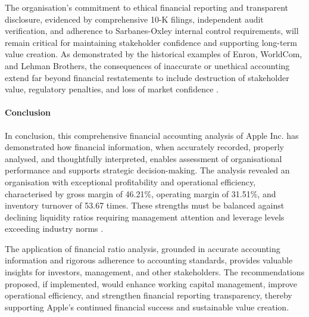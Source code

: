 \documentclass[12pt,a4paper]{article}
\begin{document}
The organisation's commitment to ethical financial reporting and transparent disclosure, evidenced by comprehensive 10-K filings, independent audit verification, and adherence to Sarbanes-Oxley internal control requirements, will remain critical for maintaining stakeholder confidence and supporting long-term value creation. As demonstrated by the historical examples of Enron, WorldCom, and Lehman Brothers, the consequences of inaccurate or unethical accounting extend far beyond financial restatements to include destruction of stakeholder value, regulatory penalties, and loss of market confidence \citep{valukas2010, healy2003}.

\paragraph{Conclusion}

In conclusion, this comprehensive financial accounting analysis of Apple Inc. has demonstrated how financial information, when accurately recorded, properly analysed, and thoughtfully interpreted, enables assessment of organisational performance and supports strategic decision-making. The analysis revealed an organisation with exceptional profitability and operational efficiency, characterised by gross margin of 46.21\%, operating margin of 31.51\%, and inventory turnover of 53.67 times. These strengths must be balanced against declining liquidity ratios requiring management attention and leverage levels exceeding industry norms \citep{kieso2023}.

The application of financial ratio analysis, grounded in accurate accounting information and rigorous adherence to accounting standards, provides valuable insights for investors, management, and other stakeholders. The recommendations proposed, if implemented, would enhance working capital management, improve operational efficiency, and strengthen financial reporting transparency, thereby supporting Apple's continued financial success and sustainable value creation.

\nocite{*}


\end{document}

